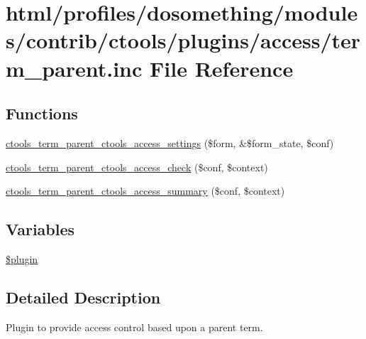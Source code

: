 \hypertarget{access_2term__parent_8inc}{
\section{html/profiles/dosomething/modules/contrib/ctools/plugins/access/term\_\-parent.inc File Reference}
\label{access_2term__parent_8inc}
}
\subsection*{Functions}
\begin{DoxyCompactItemize}
\item 
\hyperlink{access_2term__parent_8inc_a436805d3df0be2a2727d4e0e09c6e7c3}{ctools\_\-term\_\-parent\_\-ctools\_\-access\_\-settings} (\$form, \&\$form\_\-state, \$conf)
\item 
\hyperlink{access_2term__parent_8inc_ac4ae58ad965c7d47bd65046f0df37593}{ctools\_\-term\_\-parent\_\-ctools\_\-access\_\-check} (\$conf, \$context)
\item 
\hyperlink{access_2term__parent_8inc_ae35df1444913e16a75bf5301e2c04c09}{ctools\_\-term\_\-parent\_\-ctools\_\-access\_\-summary} (\$conf, \$context)
\end{DoxyCompactItemize}
\subsection*{Variables}
\begin{DoxyCompactItemize}
\item 
\hyperlink{access_2term__parent_8inc_ada8a7130088351710bb02ed622d6bf65}{\$plugin}
\end{DoxyCompactItemize}


\subsection{Detailed Description}
Plugin to provide access control based upon a parent term. 

